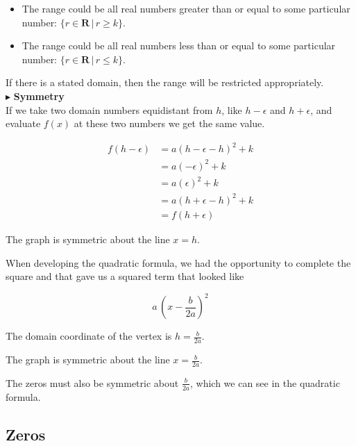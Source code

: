 \documentclass{ximera}
\begin{document}
\begin{itemize}
\item The range could be all real numbers greater than or equal to some particular number:  $\{ r \in \textbf{R} \, | \, r \geq k \}$.
\item The range could be all real numbers less than or equal to some particular number:  $\{ r \in \textbf{R} \, | \, r \leq k \}$.
\end{itemize}

If there is a stated domain, then the range will be restricted appropriately. \\






$\blacktriangleright$ \textbf{Symmetry}   \\


If we take two domain numbers equidistant from $h$, like $h - \epsilon$ and $h + \epsilon$, and evaluate $f(x)$ at these two numbers we get the same value.


\begin{align*}
f(h - \epsilon) & = a (h - \epsilon - h)^2 + k \\
& = a (-\epsilon)^2 + k  \\
& = a (\epsilon)^2 + k  \\
& = a (h + \epsilon - h)^2 + k \\
& = f(h + \epsilon)
\end{align*}


The graph is symmetric about the line $x = h$.


When developing the quadratic formula, we had the opportunity to complete the square and that gave us a squared term that looked like 

\[  a \, \left(x - \frac{b}{2a}\right)^2       \]


The domain coordinate of the vertex is $h = \frac{b}{2a}$.


The graph is symmetric about the line $x = \frac{b}{2a}$.






The zeros must also be symmetric about $\frac{b}{2a}$, which we can see in the quadratic formula. \\




\subsection{Zeros}
\end{document}
